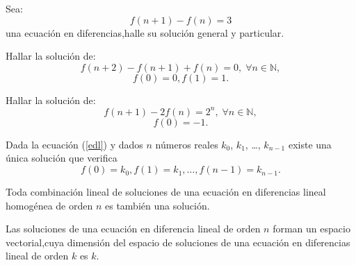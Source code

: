 \begin{frame}
\begin{example}
	Sea: \[ f\left(n+1\right)-f\left(n\right)=3 \] una ecuación en diferencias,halle su solución general
	y particular.
\end{example}
\begin{example}
	Hallar la solución de:
	$$
	f(n+2)-f(n+1)+f(n)=0, \; \forall n \in \mathbb{N},
	$$
	$$
	f(0)=0, f(1)=1.
	$$
\end{example}
\begin{example}[E.D.L.C]
	Hallar la solución de:
	$$f(n + 1) - 2f(n) = 2^{n} , \; \forall n \in \mathbb{N},$$
	$$f(0) = -1.$$
\end{example}


\end{frame}

\begin{frame}
	\begin{theorem}
		Dada la ecuación (\ref{edl}) y dados $n$ números reales $k_{0}$, $k_{1}$, \ldots, $k_{n-1}$ existe una única solución que verifica \[ f\left(0\right)=k_{0},f\left(1\right)=k_{1},\ldots,f\left(n-1\right)=k_{n-1}. \]
	\end{theorem}

	\begin{theorem}
		Toda combinación lineal de soluciones de una ecuación en diferencias lineal homogénea de orden $n$ es también una solución.
	\end{theorem}
	\begin{theorem}
		Las soluciones de una ecuación en diferencia lineal de orden $n$ forman un espacio vectorial,cuya dimensión del espacio de soluciones de una ecuación en diferencias lineal de orden $k$ es $k$.
	\end{theorem}
\end{frame}

%	


